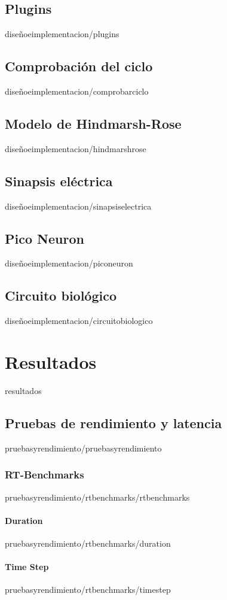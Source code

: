 \documentclass[epsbased,copyright,final,printable,covers,extendedindex,firstnumbered,tfg,gnuplot]{tfgtfmthesisuam}
\begin{document}
  \section{Plugins\label{SEC:PLUGINS}}{diseñoeimplementacion/plugins}
  \section{Comprobación del ciclo\label{SEC:COMPROBARCICLO}}{diseñoeimplementacion/comprobarciclo}
  \section{Modelo de Hindmarsh-Rose\label{SEC:HINDMARSHROSE}}{diseñoeimplementacion/hindmarshrose}
  \section{Sinapsis eléctrica\label{SEC:SINAPSISELECTRICA}}{diseñoeimplementacion/sinapsiselectrica}
  \section{Pico Neuron\label{SEC:PICONEURON}}{diseñoeimplementacion/piconeuron}
  \section{Circuito biológico\label{SEC:CIRCBIO}}{diseñoeimplementacion/circuitobiologico}
  
\chapter{Resultados\label{CAP:RESULTADOS}}{resultados}
  \section{Pruebas de rendimiento y latencia\label{SEC:PRUEVASRENDIMIENTOLATENCIA}}{pruebasyrendimiento/pruebasyrendimiento}
    \subsection{RT-Benchmarks\label{SS:RTBENCHMARKS}}{pruebasyrendimiento/rtbenchmarks/rtbenchmarks}
     \subsubsection{Duration\label{SSS:DURATION}}{pruebasyrendimiento/rtbenchmarks/duration}
     \subsubsection{Time Step\label{SSS:TIMESTEP}}{pruebasyrendimiento/rtbenchmarks/timestep}
\end{document}
